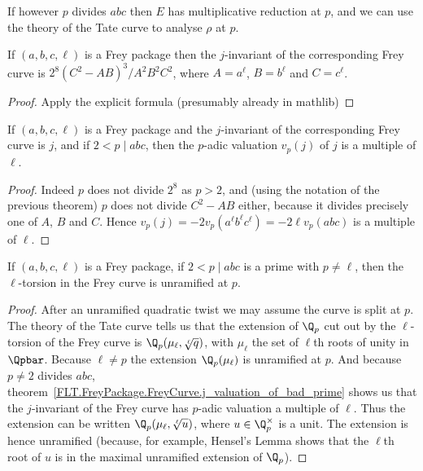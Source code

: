 If however $p$ divides $abc$ then $E$ has multiplicative
reduction at $p$, and we can use the theory of the Tate curve to analyse $\rho$ at $p$.

\begin{theorem}\label{Frey_curve_j}\leanok{} If $(a,b,c,\ell)$ is a Frey package then the $j$-invariant of the corresponding Frey curve is $2^8(C^2-AB)^3/A^2B^2C^2$, where $A=a^\ell$, $B=b^\ell$ and $C=c^\ell$.
\end{theorem}
\begin{proof}
  \leanok
  Apply the explicit formula (presumably already in mathlib)
\end{proof}

\begin{corollary}
  \label{FLT.FreyPackage.FreyCurve.j_valuation_of_bad_prime}
  \leanok
  If $(a,b,c,\ell)$ is a Frey package and the $j$-invariant of the corresponding Frey curve is $j$, and if $2<p\mid abc$, then the $p$-adic valuation $v_p(j)$ of $j$ is a multiple of $\ell$.
\end{corollary}
\begin{proof}
  \leanok
  Indeed $p$ does not divide $2^8$ as $p>2$, and (using the notation of the previous theorem) $p$ does not divide $C^2-AB$ either, because it divides precisely one of $A$, $B$ and $C$. Hence $v_p(j)=-2v_p(a^\ell b^\ell c^\ell)=-2\ell v_p(abc)$ is a multiple of $\ell$.
\end{proof}

\begin{corollary}\label{Frey_curve_unram}\notready If $(a,b,c,\ell)$ is a Frey package, if $2<p\mid abc$
  is a prime with $p\not=\ell$, then the $\ell$-torsion in the Frey curve is unramified
  at $p$.
\end{corollary}
\begin{proof}
  After an unramified quadratic twist we may assume the curve is split at $p$.
  The theory of the Tate curve tells us that the extension of $\Q_p$ cut out by the $\ell$-torsion
  of the Frey curve is $\Q_p(\mu_\ell,\sqrt[\ell]{q})$, with $\mu_\ell$ the set of $\ell$th roots
  of unity in $\Qpbar$. Because $\ell\not=p$ the extension
  $\Q_p(\mu_\ell)$ is unramified at $p$. And because $p\not=2$ divides $abc$,
  theorem~\ref{FLT.FreyPackage.FreyCurve.j_valuation_of_bad_prime} shows us that the $j$-invariant
  of the Frey curve has $p$-adic valuation a multiple of $\ell$.
  Thus the extension can be written $\Q_p(\mu_\ell,\sqrt[\ell]{u})$,
  where $u\in\Q_p^\times$ is a unit. The extension is hence unramified (because, for example,
  Hensel's Lemma shows that the $\ell$th root of $u$ is in the maximal unramified
  extension of $\Q_p$).
\end{proof}

